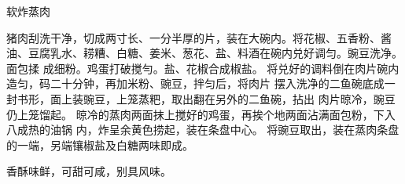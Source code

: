\begin{recipe}{软炸蒸肉}

\ingredients


\cooking

\step 猪肉刮洗干净，切成两寸长、一分半厚的片，装在大碗内。将花椒、五香粉、酱
油、豆腐乳水、耢糟、白糖、姜米、葱花、盐、料酒在碗内兑好调匀。豌豆洗净。面包揉
成细粉。鸡蛋打破搅勻。盐、花椒合成椒盐。
\step 将兑好的调料倒在肉片碗内造匀，码二十分钟，再加米粉、豌豆，拌匀后，将肉片
摆入洗净的二鱼碗底成一封书形，面上装豌豆，上笼蒸粑，取出翻在另外的二鱼碗，拈出
肉片晾冷，豌豆仍上笼馏起。
\step 晾冷的蒸肉两面抹上搅好的鸡蛋，再挨个地两面沾满面包粉，下入八成热的油锅
内，炸呈余黄色捞起，装在条盘中心。
\step 将豌豆取出，装在蒸肉条盘的一端，另端镶椒盐及白糖两味即成。

\notes

香酥味鲜，可甜可咸，别具风味。

\end{recipe}

